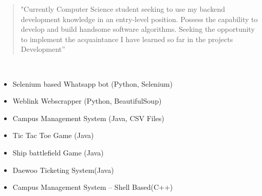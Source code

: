 \documentclass[10pt,a4paper,ragged2e,withhyper]{altacv}
\begin{document}
\begin{paracol}{2}
\switchcolumn


\begin{quote}
"Currently Computer Science student seeking to use my backend 
development knowledge in an entry-level position. Possess the 
capability to develop and build handsome software algorithms. 
Seeking the opportunity to implement the acquaintance I have learned 
so far in the projects Development''
\end{quote}






\divider\smallskip



\\


\divider\smallskip



\divider\smallskip


\begin{itemize}
\item Selenium based Whatsapp bot (Python, Selenium)
\item Weblink Webscrapper (Python, BeautifulSoup)
\item Campus Management System (Java, CSV Files)
\item Tic Tac Toe Game (Java)
\item Ship battlefield Game (Java)
\item Daewoo Ticketing System(Java)
\item Campus Management System -- Shell Based(C++)
\end{itemize}
\divider


\end{paracol}
\end{document}
